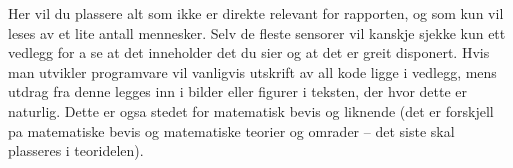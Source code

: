 

Her vil du plassere alt som ikke er direkte relevant for rapporten, og som kun vil leses av et lite antall mennesker. Selv de fleste sensorer vil kanskje sjekke kun ett vedlegg for a se at det inneholder det du sier og at det er greit disponert. Hvis man utvikler programvare vil vanligvis utskrift av all kode ligge i vedlegg, mens utdrag fra denne legges inn i bilder eller figurer i teksten, der hvor dette er naturlig. Dette er ogsa stedet for matematisk bevis og liknende (det er forskjell pa matematiske bevis og matematiske teorier og omrader – det siste skal plasseres i teoridelen).